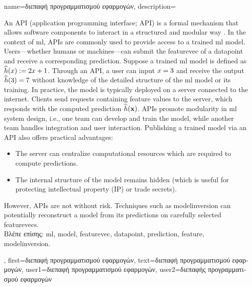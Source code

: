 {name={\foreignlanguage{greek}{διεπαφή προγραμματισμού εφαρμογών}},
		description={An  API (application programming interface; API) is a formal mechanism that 
			allows software components to interact in a structured and modular way \cite{RestfulBook2013}.
			In the context of \gls{ml}, APIs are commonly used to provide access to a trained \gls{ml} \gls{model}. 
			Users—whether humans or machines—can submit the \gls{featurevec} of a \gls{datapoint} and receive 
			a corresponding \gls{prediction}. Suppose a trained \gls{ml} \gls{model} is defined 
			as $\widehat{h}(x) := 2 x + 1$. Through an API, a user 
			can input $x = 3$ and receive the output $\widehat{h}(3) = 7$ 
			without knowledge of the detailed structure of the \gls{ml} \gls{model} or its training. 
			In practice, the \gls{model} is typically deployed on a server connected to the internet. 
			Clients send requests containing \gls{feature} values to the server, which responds with 
			the computed \gls{prediction} $\widehat{h}({\bf x})$. APIs promote modularity 
			in \gls{ml} system design, i.e., one team can develop and train the model, while another team
			handles integration and user interaction. Publishing a trained \gls{model} via an API also 
			offers practical advantages: 
			\begin{itemize} 
				\item The server can centralize computational resources which are required to compute \gls{prediction}s. 
		        		\item The internal structure of the \gls{model} remains hidden (which is useful for protecting intellectual property (IP) or trade secrets). 
		    	\end{itemize} 
			However, APIs are not without \gls{risk}. Techniques such as \gls{modelinversion} can potentially reconstruct a 
			\gls{model} from its \gls{prediction}s on carefully selected \gls{featurevec}s.\\
			\foreignlanguage{greek}{Βλέπε επίσης:} \gls{ml}, \gls{model}, \gls{featurevec}, \gls{datapoint}, \gls{prediction}, \gls{feature}, \gls{modelinversion}.
			},
		first={\foreignlanguage{greek}{διεπαφή προγραμματισμού εφαρμογών}},
		text={\foreignlanguage{greek}{διεπαφή προγραμματισμού εφαρμογών}},
		user1={\foreignlanguage{greek}{διεπαφή προγραμματισμού εφαρμογών}}, %
		user2={\foreignlanguage{greek}{διεπαφής προγραμματισμού εφαρμογών}} %
}

